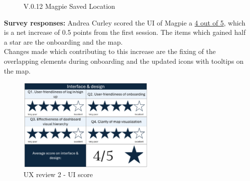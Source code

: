 \begin{figure}[h!]
    \centering
    \caption{V.0.12 Magpie Saved Location}
\end{figure}

\newpage
\noindent \textbf{Survey responses:}
Andrea Curley scored the UI of Magpie a \underline{4 out of 5}, which is a net increase of 0.5 points from the first session. The items which gained half a star are the onboarding and the map.\\
Changes made which contributing to this increase are the fixing of the overlapping elements during onboarding and the updated icons with tooltips on the map.
\begin{figure}[h!]
    \centering
    \includegraphics[width=0.6\textwidth]{images/ux-survey2-ui.png}
    \caption{UX review 2 - UI score}
\end{figure}

